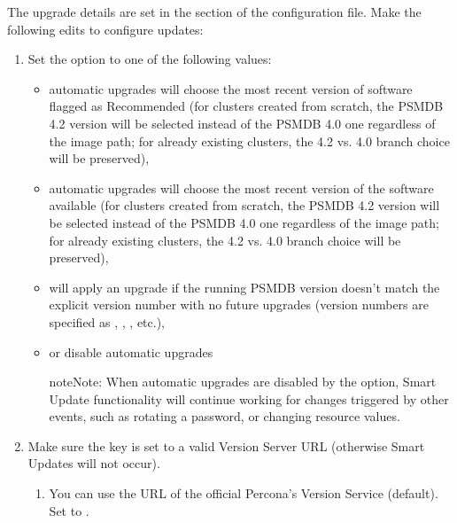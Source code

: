 \documentclass[letterpaper,10pt,english]{sphinxmanual}
\begin{document}
The upgrade details are set in the  section of the
 configuration file. Make the following edits to configure
updates:
\begin{enumerate}
%
\item {} 
Set the  option to one of the following values:
\begin{itemize}
\item {} 
 \sphinxhyphen{} automatic upgrades will choose the most recent version
of software flagged as Recommended (for clusters created from scratch,
the PSMDB 4.2 version will be selected instead of the PSMDB 4.0 one
regardless of the image path; for already existing clusters, the 4.2
vs. 4.0 branch choice will be preserved),

\item {} 
 \sphinxhyphen{} automatic upgrades will choose the most recent version of
the software available (for clusters created from scratch,
the PSMDB 4.2 version will be selected instead of the PSMDB 4.0 one
regardless of the image path; for already existing clusters, the 4.2
vs. 4.0 branch choice will be preserved),

\item {} 
 \sphinxhyphen{} will apply an upgrade if the running PSMDB
version doesn’t match the explicit version number with no future upgrades
(version numbers are specified as , ,
, etc.),

\item {} 
 or  \sphinxhyphen{} disable automatic upgrades

\begin{sphinxadmonition}{note}{Note:}
When automatic upgrades are disabled by the  option,
Smart Update functionality will continue working for changes triggered
by other events, such as rotating a password, or
changing resource values.
\end{sphinxadmonition}

\end{itemize}

\item {} 
Make sure the  key is set to a valid Version
Server URL (otherwise Smart Updates will not occur).
\begin{enumerate}
%
\item {} 
You can use the URL of the official Percona’s Version Service (default).
Set  to .


\end{enumerate}
\end{enumerate}
\end{document}
